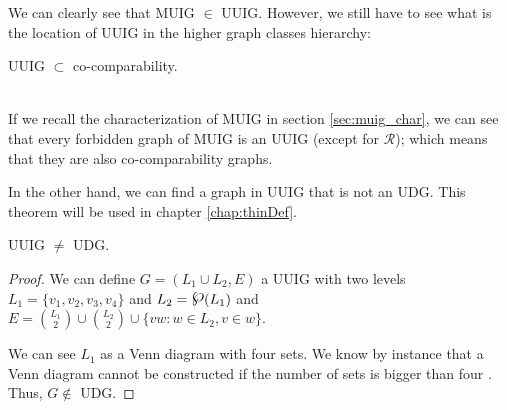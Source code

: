 We can clearly see that MUIG $\in$ UUIG. However, we still have to see what is the location of UUIG in the higher graph classes hierarchy:

\begin{prop}
  UUIG $\subset$ co-comparability.
\end{prop}

\\

If we recall the characterization of MUIG in section \ref{sec:muig_char}, we can see that every forbidden graph of MUIG is an
UUIG (except for $\mathcal{R}$); which means that they are also co-comparability graphs.

In the other hand, we can find a graph in UUIG that is not an UDG. This theorem will be used in chapter \ref{chap:thinDef}.

\begin{theorem}
  UUIG $\neq$ UDG.
\end{theorem}

\begin{proof}
  We can define $G = (L_1\cup L_2, E)$ a UUIG with two levels $L_1=\{v_1, v_2, v_3, v_4\}$ and $L_2=\powerset(L_1)$ and $E = \binom{L_1}{2} \cup \binom{L_2}{2} \cup \{vw: w\in L_2, v\in w\}$.

  We can see $L_1$ as a Venn diagram with four sets. We know by instance that a Venn diagram cannot be constructed if the number of sets is bigger than four \cite{vennDiagrammaticMechanicalRepresentation1880}. Thus, $G \notin$ UDG.
\end{proof}


